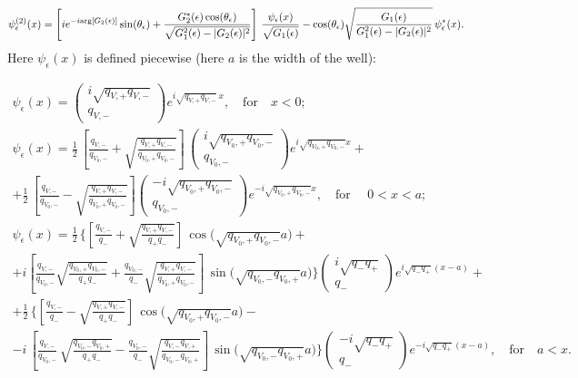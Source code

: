 \documentclass[12pt]{article}
\begin{document}
\begin{equation}
	\psi^{(2)}_{\epsilon}(x) = \left[i e^{-i {\rm arg}[G_2(\epsilon)]}\sin(\theta_{\epsilon})+\frac{G^*_2(\epsilon)\cos(\theta_{\epsilon})}{\sqrt{G_1^2(\epsilon)-|G_2(\epsilon)|^2}}\right] \, \frac{\psi_{\epsilon}(x)}{\sqrt{G_1(\epsilon)}}-\cos(\theta_{\epsilon})\sqrt{\frac{G_1(\epsilon)}{G_1^2(\epsilon)-|G_2(\epsilon)|^2}} \, \psi^*_{\epsilon}(x).
\end{equation}
Here $\psi_{\epsilon}(x)$ is defined piecewise (here $a$ is the width of the well):

\begin{gather}
    \psi_{\epsilon}(x)=\begin{pmatrix}
		i\sqrt{q_{V,+}q_{V,-}}\\
		q_{V,-}
	\end{pmatrix}e^{i\sqrt{q_{V,+}q_{V,-}} \, x}, \quad \text{for} \quad x<0; \nonumber \\
    \psi_{\epsilon}(x) = \frac{1}{2} \, \left[\frac{q_{V,-}}{q_{V_0,-}}+\sqrt{\frac{q_{V,+}q_{V,-}}{q_{V_0,+}q_{V_0,-}}}\right] \, \begin{pmatrix}
		i\sqrt{q_{V_0,+}q_{V_0,-}}\\
		q_{V_0,-}
	\end{pmatrix}e^{i\sqrt{q_{V_0,+}q_{V_0,-}}x}+\nonumber \\
	+ \frac{1}{2} \, \left[\frac{q_{V,-}}{q_{V_0,-}}-\sqrt{\frac{q_{V,+}q_{V,-}}{q_{V_0,+}q_{V_0,-}}}\right]\begin{pmatrix}
		-i\sqrt{q_{V_0,+}q_{V_0,-}}\\
		q_{V_0,-}
	\end{pmatrix}e^{-i\sqrt{q_{V_0,+}q_{V_0,-}}x}, \quad \text{for } \quad 0<x<a; \\
	\psi_{\epsilon}(x) = \frac{1}{2}\, \Bigg\{\left[\frac{q_{V,-}}{q_{-}}+\sqrt{\frac{q_{V,+}q_{V,-}}{q_{+}q_{-}}}\right] \, \cos\Big(\sqrt{q_{V_0,+}q_{V_0,-}}a\Big) + \nonumber \\ 
    + i \left[\frac{q_{V,-}}{q_{V_0,-}}\sqrt{\frac{q_{V_0,+}q_{V_0,-}}{q_{+}q_{-}}}
	+\frac{q_{V_0,-}}{q_{-}}\sqrt{\frac{q_{V,+}q_{V,-}}{q_{V_0,+}q_{V_0,-}}}\right] \, \sin\Big(\sqrt{q_{V_0,-}q_{V_0,+}}a\Big)\Bigg\}\begin{pmatrix}
		i\sqrt{q_{-}q_{+}}\\
		q_{-}
	\end{pmatrix}e^{i\sqrt{q_{-}q_{+}}(x-a)} + \nonumber \\
	+\frac{1}{2} \, \Bigg\{\left[\frac{q_{V,-}}{q_{-}}-\sqrt{\frac{q_{V,+}q_{V,-}}{q_{+}q_{-}}}\right] \, \cos\Big(\sqrt{q_{V_0,+}q_{V_0,-}}a\Big) - \nonumber \\
    - i \, \left[\frac{q_{V,-}}{q_{V_0,-}} \, \sqrt{\frac{q_{V_0,-}q_{V_0,+}}{q_{+}q_{-}}}
	 - \frac{q_{V_0,-}}{q_{-}}\sqrt{\frac{q_{V,-}q_{V,+}}{q_{V_0,-}q_{V_0,+}}}\right] \, \sin\Big(\sqrt{q_{V_0,-}q_{V_0,+}}a\Big)\Bigg\}\begin{pmatrix}
		-i\sqrt{q_{-}q_{+}}\\
		q_{-}
	\end{pmatrix}e^{-i\sqrt{q_{-}q_{+}}(x-a)}, \quad \text{for} \quad a<x. \nonumber 
\end{gather}
\end{document}
